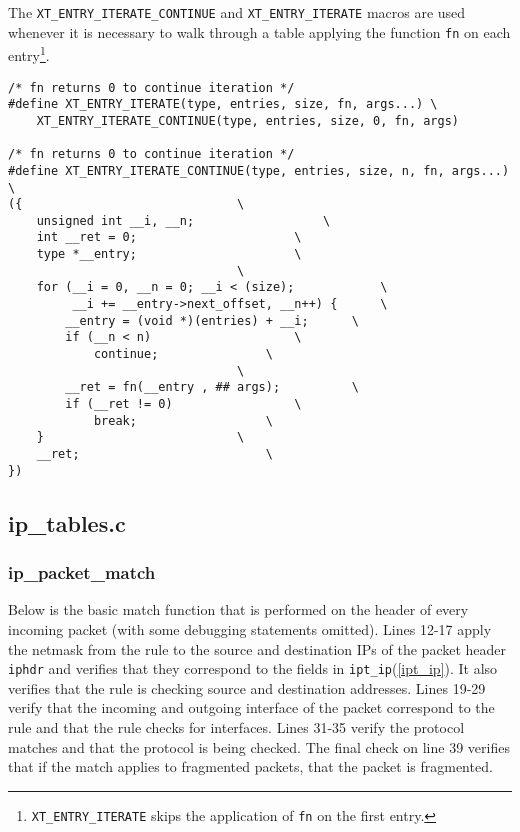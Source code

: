 \documentclass[a4paper,10pt]{article}
\newcommand{\code}[1]{\texttt{#1}}
\begin{document}
The \code{XT\_ENTRY\_ITERATE\_CONTINUE} and \code{XT\_ENTRY\_ITERATE}
macros are used whenever it is necessary to walk through a table
applying the function \code{fn} on each
entry\footnote{\code{XT\_ENTRY\_ITERATE} skips the application of
  \code{fn} on the first entry.}.

\begin{lstlisting}
/* fn returns 0 to continue iteration */
#define XT_ENTRY_ITERATE(type, entries, size, fn, args...) \
	XT_ENTRY_ITERATE_CONTINUE(type, entries, size, 0, fn, args)

/* fn returns 0 to continue iteration */
#define XT_ENTRY_ITERATE_CONTINUE(type, entries, size, n, fn, args...) \
({								\
	unsigned int __i, __n;					\
	int __ret = 0;						\
	type *__entry;						\
								\
	for (__i = 0, __n = 0; __i < (size);			\
	     __i += __entry->next_offset, __n++) { 		\
		__entry = (void *)(entries) + __i;		\
		if (__n < n)					\
			continue;				\
								\
		__ret = fn(__entry , ## args);			\
		if (__ret != 0)					\
			break;					\
	}							\
	__ret;							\
})
\end{lstlisting}

\subsection{ip\_tables.c}

\subsubsection{ip\_packet\_match}

Below is the basic match function that is performed on the header of
every incoming packet (with some debugging statements omitted). Lines
12-17 apply the netmask from the rule to the source and destination
IPs of the packet header \code{iphdr} and verifies that they
correspond to the fields in \code{ipt\_ip}(\ref{ipt_ip}). It also
verifies that the rule is checking source and destination
addresses. Lines 19-29 verify that the incoming and outgoing interface
of the packet correspond to the rule and that the rule checks for
interfaces. Lines 31-35 verify the protocol matches and that the
protocol is being checked. The final check on line 39 verifies that if
the match applies to fragmented packets, that the packet is
fragmented.


\lstset{stepnumber=1,frame=single,numbers=left,numberstyle=\footnotesize}
\end{document}
